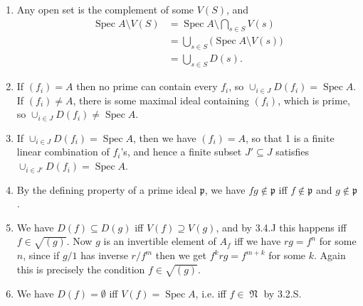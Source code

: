 \documentclass{report}
\newcommand{\rad}[1]{\sqrt{#1}} %
\newcommand{\p}{\mathfrak{p}}
\DeclareMathOperator{\Spec}{Spec}
\DeclareMathOperator{\nilrad}{\mathfrak{N}}
\begin{document}
\begin{enumerate}[label=\textbf{3.5.\Alph*.}]
	\item Any open set is the complement of some $V(S)$, and
	      \begin{align*}
		      \Spec A\setminus V(S)
		       & = \Spec A\setminus\bigcap_{s\in S}V(s)              \\
		       & = \bigcup_{s\in S}\bigl(\Spec A\setminus V(s)\bigr) \\
		       & = \bigcup_{s\in S}D(s).
	      \end{align*}

	\item If $(f_i)=A$ then no prime can contain every $f_i$, so
	      $\cup_{i\in J}D(f_i)=\Spec A$. If $(f_i)\ne A$, there is some maximal
	      ideal containing $(f_i)$, which is prime, so
	      $\cup_{i\in J}D(f_i)\ne\Spec A$.

	\item If $\cup_{i\in J}D(f_i)=\Spec A$, then we have $(f_i)=A$, so that 1 is
	      a finite linear combination of $f_i$'s, and hence a finite subset
	      $J'\subseteq J$ satisfies $\cup_{i\in J'}D(f_i)=\Spec A$.

	\item By the defining property of a prime ideal $\p$, we have $fg\notin\p$
	      iff $f\notin\p$ and $g\notin\p$.

	\item We have $D(f)\subseteq D(g)$ iff $V(f)\supseteq V(g)$, and by 3.4.J
	      this happens iff $f\in\rad{(g)}$. Now $g$ is an invertible element of
	      $A_f$ iff we have $rg=f^n$ for some $n$, since if $g/1$ has inverse
	      $r/f^m$ then we get $f^krg=f^{m+k}$ for some $k$. Again this is
	      precisely the condition $f\in\rad{(g)}$.

	\item We have $D(f)=\emptyset$ iff $V(f)=\Spec A$, i.e. iff
	      $f\in\nilrad$ by 3.2.S.
\end{enumerate}
\end{document}
